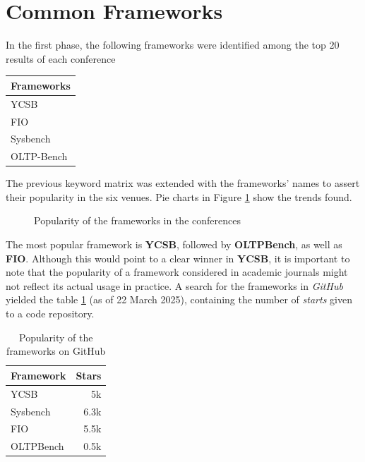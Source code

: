 \section{Common Frameworks}

In the first phase, the following frameworks were identified among the top 20 results of each conference
\begin{center}
    \begin{tabular}{|l|}
        \hline
        \textbf{Frameworks} \\ \hline\hline
        \ac{YCSB} \cite{cooperBenchmarkingCloudServing2010} \\ \hline
        \ac{FIO} \cite{1FioFlexible} \\ \hline
        Sysbench \cite{kopytovAkopytovSysbench2025} \\ \hline
        OLTP-Bench \cite{difallahOLTPBenchExtensibleTestbed2013} \\ \hline
    \end{tabular}
\end{center}

The previous keyword matrix was extended with the frameworks' names to assert their popularity in the six venues. 
Pie charts in Figure \ref{fig:popularity_frameworks} show the trends found.

\begin{figure}[h]
    \centering
    
    \caption{Popularity of the frameworks in the conferences}
    \label{fig:popularity_frameworks}
\end{figure}

The most popular framework is \textbf{YCSB}, followed by \textbf{OLTPBench}, as well as \textbf{FIO}. Although this would point to a clear winner in \textbf{YCSB}, 
it is important to note that the popularity of a framework considered in academic journals might not reflect its actual usage in practice. 
A search for the frameworks in \textit{GitHub} yielded the table \ref{fig:popularity_frameworks} (as of 22 March 2025), containing
the number of \textit{starts} given to a code repository. 

\begin{table}[h]
    \centering
    \begin{tabular}{|l|r|}
      \hline
      \textbf{Framework} & \textbf{Stars} \\ \hline\hline
      YCSB & 5k \\ \hline
      Sysbench & 6.3k \\ \hline
      FIO & 5.5k \\ \hline
      OLTPBench & 0.5k \\ \hline
    \end{tabular}
    \caption{Popularity of the frameworks on GitHub}
    \label{tab:popularity_github}
\end{table}

